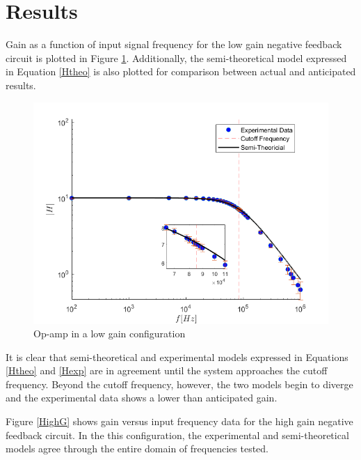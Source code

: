 \documentclass[letterpaper,12pt]{article}
\begin{document}
\section{Results}
Gain as a function of input signal frequency for the low gain negative feedback circuit is plotted in Figure \ref{LowG}. Additionally, the semi-theoretical model expressed in Equation \ref{Htheo} is also plotted for comparison between actual and anticipated results.  

\begin{figure}[ht]
    \centering
    \includegraphics[scale = .6]{LowGain.png}
    \caption{Op-amp in a low gain configuration}
    \label{LowG}
\end{figure}
It is clear that semi-theoretical and experimental models expressed in Equations \ref{Htheo} and \ref{Hexp} are in agreement until the system approaches the cutoff frequency. Beyond the cutoff frequency, however, the two models begin to diverge and the experimental data shows a lower than anticipated gain.

Figure \ref{HighG} shows gain versus input frequency data for the high gain negative feedback circuit. In the this configuration, the experimental and semi-theoretical models agree through the entire domain of frequencies tested.
\end{document}
